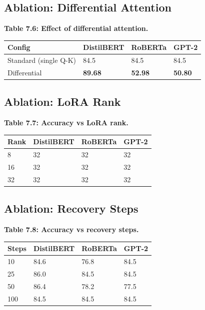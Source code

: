 \subsection{Ablation: Differential Attention}

\textbf{Table 7.6: Effect of differential attention.}

\begin{table}[H]
\centering
\small
\begin{tabular}{llll}
\toprule
\textbf{Config} & \textbf{DistilBERT} & \textbf{RoBERTa} & \textbf{GPT-2} \\
\midrule
Standard (single Q-K) & 84.5 & 84.5 & 84.5 \\
Differential & \textbf{89.68} & \textbf{52.98} & \textbf{50.80} \\
\bottomrule
\end{tabular}
\end{table}

\subsection{Ablation: LoRA Rank}

\textbf{Table 7.7: Accuracy vs LoRA rank.}

\begin{table}[H]
\centering
\small
\begin{tabular}{llll}
\toprule
\textbf{Rank} & \textbf{DistilBERT} & \textbf{RoBERTa} & \textbf{GPT-2} \\
\midrule
8 & 32 & 32 & 32 \\
16 & 32 & 32 & 32 \\
32 & 32 & 32 & 32 \\
\bottomrule
\end{tabular}
\end{table}

\subsection{Ablation: Recovery Steps}

\textbf{Table 7.8: Accuracy vs recovery steps.}

\begin{table}[H]
\centering
\small
\begin{tabular}{llll}
\toprule
\textbf{Steps} & \textbf{DistilBERT} & \textbf{RoBERTa} & \textbf{GPT-2} \\
\midrule
10 & 84.6 & 76.8 & 84.5 \\
25 & 86.0 & 84.5 & 84.5 \\
50 & 86.4 & 78.2 & 77.5 \\
100 & 84.5 & 84.5 & 84.5 \\
\bottomrule
\end{tabular}
\end{table}


